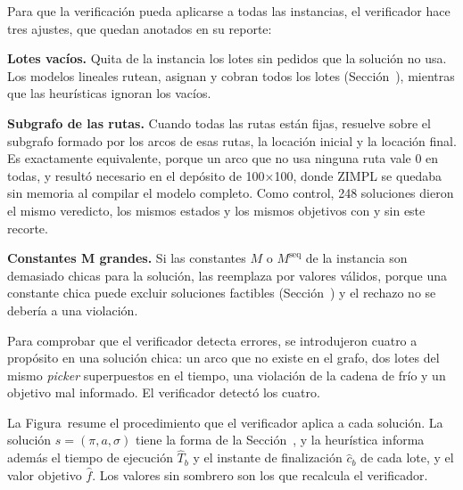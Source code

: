 \stopsection

\startsection[title={Ajustes del verificador}]

Para que la verificación pueda aplicarse a todas las instancias, el
verificador hace tres ajustes, que quedan anotados en su reporte:
\startitemize[n]
	\item {\bf Lotes vacíos.} Quita de la instancia los lotes sin pedidos que
	la solución no usa. Los modelos lineales rutean, asignan y cobran todos
	los lotes (Sección~), mientras que las
	heurísticas ignoran los vacíos.
	\item {\bf Subgrafo de las rutas.} Cuando todas las rutas están fijas,
	resuelve sobre el subgrafo formado por los arcos de esas rutas, la
	locación inicial y la locación final. Es exactamente equivalente, porque un arco
	que no usa ninguna ruta vale 0 en todas, y resultó necesario en el depósito
	de 100×100, donde ZIMPL se quedaba sin memoria al compilar el modelo
	completo. Como control, 248 soluciones dieron el mismo veredicto, los
	mismos estados y los mismos objetivos con y sin este recorte.
	\item {\bf Constantes M grandes.} Si las constantes $M$ o $M^{\text{seq}}$
	de la instancia son demasiado chicas para la solución, las reemplaza por
	valores válidos, porque una constante chica puede excluir soluciones
	factibles (Sección~) y el rechazo no se debería a
	una violación.
\stopitemize

\stopsection

\startsection[title={Validación del verificador}]

Para comprobar que el verificador detecta errores, se introdujeron cuatro a
propósito en una solución chica: un arco que no existe en el grafo, dos lotes
del mismo {\em picker} superpuestos en el tiempo, una violación de la cadena
de frío y un objetivo mal informado. El verificador detectó los cuatro.

\stopsection

\startsection[title={Pseudocódigo}]

La Figura~ resume el procedimiento que el
verificador aplica a cada solución. La solución $s = (\pi, a, \sigma)$ tiene
la forma de la Sección~, y la heurística informa
además el tiempo de ejecución $\hat{T}_b$ y el instante de finalización
$\hat{c}_b$ de cada lote, y el valor objetivo $\hat{f}$. Los valores sin
sombrero son los que recalcula el verificador.


